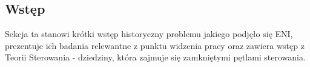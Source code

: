 \subsection{Wstęp}

Sekcja ta stanowi krótki wstęp historyczny problemu jakiego podjęło się ENI, prezentuje ich badania relewantne z punktu widzenia pracy oraz zawiera wstęp z Teorii Sterowania - dziedziny, która zajmuje się zamkniętymi pętlami sterowania. 